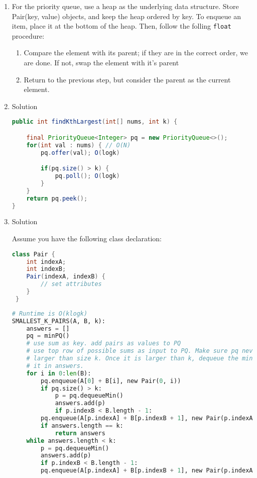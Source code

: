 \documentclass{article}
\begin{document}
\clearpage

\begin{enumerate}

	\item For the priority queue, use a heap as the underlying data structure. Store Pair(key, value) objects, and keep the heap ordered by key. To enqueue an item, place it at the bottom of the heap. Then, follow the folling \texttt{float} procedure:

	      \begin{enumerate}
	      	\item Compare the element with its parent; if they are in the correct order, we are done. If not, swap the element with it's parent
	      	\item Return to the previous step, but consider the parent as the current element.
	      \end{enumerate}
	\item Solution
	      \begin{lstlisting}[language=Java]
public int findKthLargest(int[] nums, int k) {

    final PriorityQueue<Integer> pq = new PriorityQueue<>();
    for(int val : nums) { // O(N)
        pq.offer(val); O(logk)

        if(pq.size() > k) {
            pq.poll(); O(logk)
        }
    }
    return pq.peek();
}

	      \end{lstlisting}

	\item Solution

	Assume you have the following class declaration:

	      \begin{lstlisting}[language=Java]
class Pair {
    int indexA;
    int indexB;
    Pair(indexA, indexB) {
        // set attributes
    }
 }
	      \end{lstlisting}
	      \begin{lstlisting}[language=python]
# Runtime is O(klogk)
SMALLEST_K_PAIRS(A, B, k):
    answers = []
    pq = minPQ()
    # use sum as key. add pairs as values to PQ
    # use top row of possible sums as input to PQ. Make sure pq never grows
    # larger than size k. Once it is larger than k, dequeue the min and place
    # it in answers.
    for i in 0:len(B):
        pq.enqueue(A[0] + B[i], new Pair(0, i))
        if pq.size() > k:
            p = pq.dequeueMin()
            answers.add(p)
            if p.indexB < B.length - 1:
		pq.enqueue(A[p.indexA] + B[p.indexB + 1], new Pair(p.indexA, p.indexB + 1))
        if answers.length == k:
            return answers
    while answers.length < k:
        p = pq.dequeueMin()
        answers.add(p)
        if p.indexB < B.length - 1:
	    pq.enqueue(A[p.indexA] + B[p.indexB + 1], new Pair(p.indexA, p.indexB + 1))


\end{lstlisting}
\end{enumerate}
\end{document}
